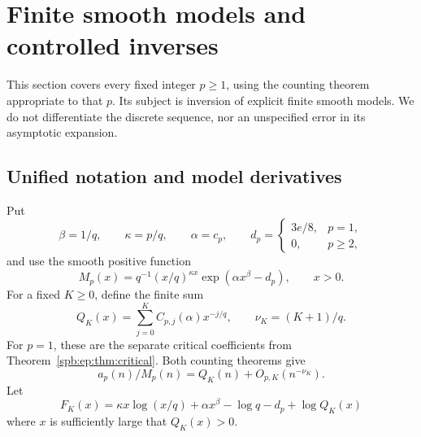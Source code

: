 \section{Finite smooth models and controlled inverses}
\label{spb:ep:sec:inverse}
This section covers every fixed integer $p\ge1$, using the counting theorem
appropriate to that $p$. Its subject is inversion of explicit finite smooth
models. We do not differentiate the discrete sequence, nor an unspecified
error in its asymptotic expansion.

\subsection{Unified notation and model derivatives}
Put
\begin{equation}\label{spb:ep:eq:inverseparams}
 \beta=1/q,\qquad \kappa=p/q,\qquad \alpha=c_p,\qquad
 d_p=\begin{cases}3e/8,&p=1,\\0,&p\ge2,\end{cases}
\end{equation}
and use the smooth positive function
\begin{equation}\label{spb:ep:eq:smoothM}
 M_p(x)=q^{-1}(x/q)^{\kappa x}\exp(\alpha x^\beta-d_p),
 \qquad x>0.
\end{equation}
For a fixed $K\ge0$, define the finite sum
\begin{equation}\label{spb:ep:eq:QK}
 Q_K(x)=\sum_{j=0}^K C_{p,j}(\alpha)x^{-j/q},\qquad
 \nu_K=(K+1)/q.
\end{equation}
For $p=1$, these are the separate critical coefficients from
Theorem~\ref{spb:ep:thm:critical}. Both counting theorems give
\begin{equation}\label{spb:ep:eq:modelvalue}
 a_p(n)/M_p(n)=Q_K(n)+O_{p,K}(n^{-\nu_K}).
\end{equation}
Let
\begin{equation}\label{spb:ep:eq:Fmodel}
 F_K(x)=\kappa x\log(x/q)+\alpha x^\beta-\log q-d_p+\log Q_K(x)
\end{equation}
where $x$ is sufficiently large that $Q_K(x)>0$.

